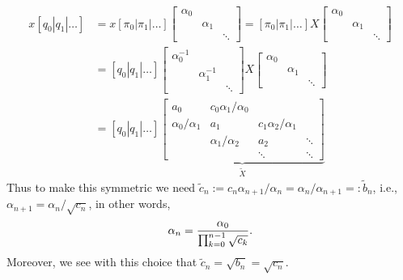 \documentclass[12pt,a4paper]{article}
\def\bt{ {\tilde b} }
\def\ct{ {\tilde c} }
\def\Xt{ {\tilde X} }
\begin{document}
\begin{align*}
x [q_0 | q_1 | \ensuremath{\ldots} ] &= x[\ensuremath{\pi}_0 | \ensuremath{\pi}_1 | \ensuremath{\ldots}] \begin{bmatrix} \ensuremath{\alpha}_0 \\ & \ensuremath{\alpha}_1 \\ && \ensuremath{\ddots} \end{bmatrix} = [\ensuremath{\pi}_0 | \ensuremath{\pi}_1 | \ensuremath{\ldots}] X \begin{bmatrix} \ensuremath{\alpha}_0 \\ & \ensuremath{\alpha}_1 \\ && \ensuremath{\ddots} \end{bmatrix}   \\
&=[q_0 | q_1 | \ensuremath{\ldots}] \begin{bmatrix} \ensuremath{\alpha}_0^{-1} \\ & \ensuremath{\alpha}_1^{-1} \\ && \ensuremath{\ddots} \end{bmatrix}  X \begin{bmatrix} \ensuremath{\alpha}_0 \\ & \ensuremath{\alpha}_1 \\ && \ensuremath{\ddots} \end{bmatrix} \\
&=[q_0 | q_1 | \ensuremath{\ldots}] \underbrace{\begin{bmatrix}  a_0 & c_0 \ensuremath{\alpha}_1/\ensuremath{\alpha}_0 \\
									\ensuremath{\alpha}_0/\ensuremath{\alpha}_1 & a_1 & c_1 \ensuremath{\alpha}_2/\ensuremath{\alpha}_1 \\
									& \ensuremath{\alpha}_1/\ensuremath{\alpha}_2 & a_2 & \ensuremath{\ddots} \\
									&& \ensuremath{\ddots} & \ensuremath{\ddots}
									\end{bmatrix}}_{\Xt}
\end{align*}
Thus to make this symmetric we need $\ct_n := c_n \ensuremath{\alpha}_{n+1}/\ensuremath{\alpha}_n = \ensuremath{\alpha}_n/\ensuremath{\alpha}_{n+1} =: \bt_n$, i.e., $\ensuremath{\alpha}_{n+1} = \ensuremath{\alpha}_n/\sqrt{c_n}$, in other words,
\[
\ensuremath{\alpha}_n = {\ensuremath{\alpha}_0 \over \ensuremath{\prod}_{k=0}^{n-1} \sqrt{c_k}}.
\]
Moreover, we see with this choice that $\ct_n = \sqrt{b_n} = \sqrt{c_n}$.
\end{document}
